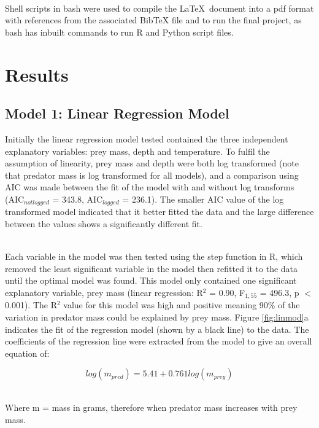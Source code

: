 \documentclass[11pt,a4paper]{article}
\begin{document}
	\par \noindent ~\\Shell scripts in bash were used to compile the \LaTeX \ document into a pdf format with references from the associated BibTeX file and to run the final project, as bash has inbuilt commands to run R and Python script files.
	
	\section{Results}
	
	\subsection{Model 1: Linear Regression Model}
	
	\par \noindent Initially the linear regression model tested contained the three independent explanatory variables: prey mass, depth and temperature. To fulfil the assumption of linearity, prey mass and depth were both log transformed  (note that predator mass is log transformed for all models), and a comparison using AIC was made between the fit of the model with and without log transforms (AIC$_{notlogged}$ = 343.8, AIC$_{logged}$ = 236.1). The smaller AIC value of the log transformed model indicated that it better fitted the data and the large difference between the values shows a significantly different fit.
	
	\par \noindent ~\\ Each variable in the model was then tested using the step function in R, which removed the least significant variable in the model then refitted it to the data until the optimal model was found. This model only contained one significant explanatory variable, prey mass (linear regression: R$^2$ = 0.90, F$_{1,55}$ = 496.3, p $<$ 0.001). The R$^2$ value for this model was high and positive meaning 90\% of the variation in predator mass could be explained by prey mass. Figure \ref{fig:linmod}a indicates the fit of the regression model (shown by a black line) to the data. The coefficients of the regression line were extracted from the model to give an overall equation of:
	
	\begin{equation*}
		log(m_{pred}) = 5.41 + 0.761log(m_{prey})
	\end{equation*}
	
	\par \noindent ~\\ Where m = mass in grams, therefore when predator mass increases with prey mass.
	
\end{document}
